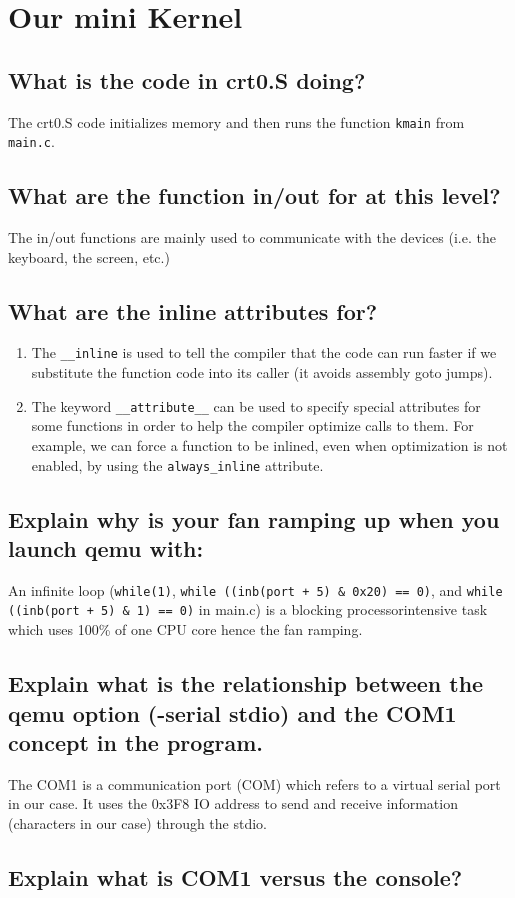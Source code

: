 \documentclass[10]{article}
\begin{document}
\section{Our mini Kernel}

\subsection{What is the code in crt0.S doing?}
The crt0.S code initializes memory and then runs the function \texttt{kmain} from \texttt{main.c}.

\subsection{What are the function in/out for at this level?}
The in/out functions are mainly used to communicate with the devices (i.e. the keyboard, the screen, etc.)
\subsection{What are the inline attributes for?}
\begin{enumerate}
 	\item
 	The \texttt{\_\_inline} is used to tell the compiler that the code can run faster if we substitute the function code into its caller (it avoids assembly goto jumps).
 	\item
 	The keyword \texttt{\_\_attribute\_\_} can be used to specify special attributes for some functions in order to help the compiler optimize calls to them. For example, we can force a function to be inlined, even when optimization is not enabled, by using the \texttt{always\_inline} attribute.

\end{enumerate}
\subsection{Explain why is your fan ramping up when you launch qemu with:}
An infinite loop (\texttt{while(1)}, \texttt{while ((inb(port + 5) \& 0x20) == 0)}, and \texttt{while ((inb(port + 5) \& 1) == 0)} in main.c) is a blocking processor\-intensive task which uses 100\% of one CPU core hence the fan ramping.

\subsection{Explain what is the relationship between the qemu option (-serial stdio) and the COM1 concept in the program.}

The COM1 is a communication port (COM) which refers to a virtual serial port in our case. It uses the 0x3F8 I\/O address to send and receive information (characters in our case) through the stdio.
\subsection{Explain what is COM1 versus the console?}
\end{document}
